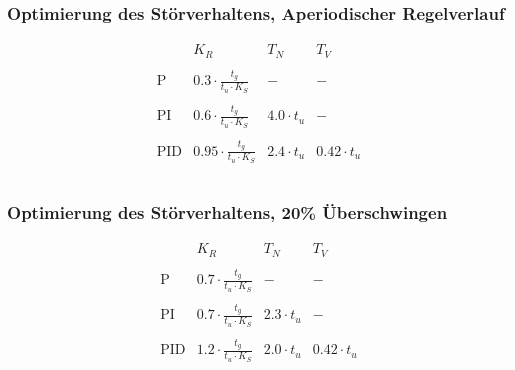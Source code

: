 \subsubsection{Optimierung des Störverhaltens, Aperiodischer Regelverlauf}
\begin{table}[h!]
    \[
        \begin{array}{lccc}
            &
                K_R &
                T_N &
                T_V \\\\
            \text{P} &
                0.3 \cdot \frac{t_g}{t_u \cdot K_S} &
                - &
                - \\\\
            \text{PI} &
                0.6 \cdot \frac{t_g}{t_u \cdot K_S} &
                4.0 \cdot t_u &
                - \\\\
            \text{PID} &
                0.95 \cdot \frac{t_g}{t_u \cdot K_S} &
                2.4 \cdot t_u &
                0.42 \cdot t_u \\\\
        \end{array}
    \]
\end{table}

\subsubsection{Optimierung des Störverhaltens, 20\% Überschwingen}
\begin{table}[h!]
    \[
        \begin{array}{lccc}
            &
                K_R &
                T_N &
                T_V \\\\
            \text{P} &
                0.7 \cdot \frac{t_g}{t_u \cdot K_S} &
                - &
                - \\\\
            \text{PI} &
                0.7 \cdot \frac{t_g}{t_u \cdot K_S} &
                2.3 \cdot t_u &
                - \\\\
            \text{PID} &
                1.2 \cdot \frac{t_g}{t_u \cdot K_S} &
                2.0 \cdot t_u &
                0.42 \cdot t_u \\\\
        \end{array}
    \]
\end{table}

